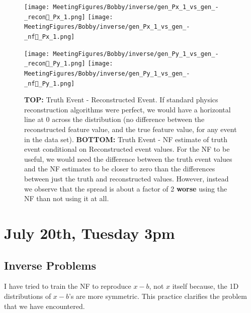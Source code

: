 \begin{figure}[!ht]
    \centering
    \begin{minipage}{.5\textwidth}
    
        \centering
        
        \texttt{[image: MeetingFigures/Bobby/inverse/gen\_Px\_1\_vs\_gen\_-\_recon\_Px\_1.png]}
        \texttt{[image: MeetingFigures/Bobby/inverse/gen\_Px\_1\_vs\_gen\_-\_nf\_Px\_1.png]}

    \end{minipage}%
    \begin{minipage}{.5\textwidth}
    
        \centering
        
        \texttt{[image: MeetingFigures/Bobby/inverse/gen\_Py\_1\_vs\_gen\_-\_recon\_Py\_1.png]}
        \texttt{[image: MeetingFigures/Bobby/inverse/gen\_Py\_1\_vs\_gen\_-\_nf\_Py\_1.png]}

    \end{minipage}%
    \caption{\textbf{TOP:} Truth Event - Reconstructed Event. If standard physics reconstruction algorithms were perfect, we would have a horizontal line at 0 across the distribution (no difference between the reconstructed feature value, and the true feature value, for any event in the data set). \textbf{BOTTOM:} Truth Event - NF estimate of truth event conditional on Reconstructed event values. For the NF to be useful, we would need the difference between the truth event values and the NF estimates to be closer to zero than the differences between just the truth and reconstructed values. However, instead we observe that the spread is about a factor of 2 \textbf{worse} using the NF than not using it at all. }
    \label{fig:16features}
\end{figure}

\clearpage
\section{July 20th, Tuesday 3pm}
\subsection{Inverse Problems}

I have tried to train the NF to reproduce $x-b$, not $x$ itself because, the 1D distributions of $x-b$'s are more symmetric. This practice clarifies the problem that we have encountered.

